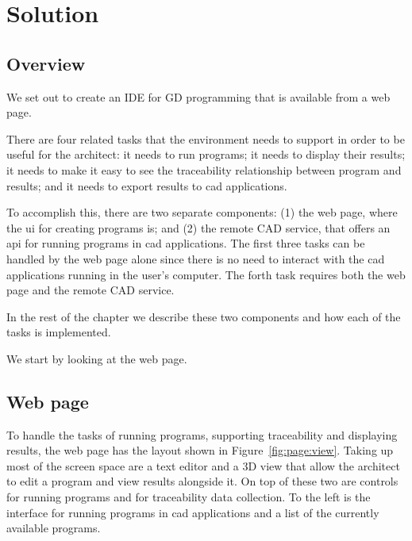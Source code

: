 
\chapter{Solution}
\label{chapter:solution}


\section{Overview}
We set out to create an IDE for GD programming that is available from a web page.

There are four related tasks that the environment needs to support in order to be useful for the architect:
it needs to run programs; it needs to display their results; it needs to make it easy to see the traceability relationship between program and results; and it needs to export results to \gls{cad} applications.

To accomplish this, there are two separate components: (1) the web page, where the \gls{ui} for creating programs is; and (2) the remote CAD service, that offers an \gls{api} for running programs in \gls{cad} applications.
The first three tasks can be handled by the web page alone since there is no need to interact with the \gls{cad} applications running in the user's computer.
The forth task requires both the web page and the remote CAD service.

In the rest of the chapter we describe these two components and how each of the tasks is implemented.

We start by looking at the web page.


\section{Web page}
To handle the tasks of running programs, supporting traceability and displaying results, the web page has the layout shown in Figure~\ref{fig:page:view}.
Taking up most of the screen space are a text editor and a 3D view that allow the architect to edit a program and view results alongside it.
On top of these two are controls for running programs and for traceability data collection.
To the left is the interface for running programs in \gls{cad} applications and a list of the currently available programs.



